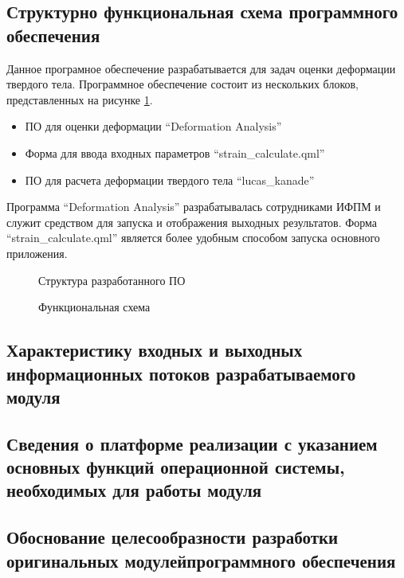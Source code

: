 \subsection{Структурно функциональная схема программного обеспечения}%

Данное програмное обеспечение разрабатывается для задач оценки деформации твердого тела. Программное обеспечение состоит из нескольких блоков, представленных на рисунке \ref{pic:shema_PO}.

\begin{itemize}
\item ПО для оценки деформации ``Deformation Analysis''
\item Форма для ввода входных параметров ``strain\_calculate.qml''
\item ПО для расчета деформации твердого тела ``lucas\_kanade''
\end{itemize}

Программа ``Deformation Analysis'' разрабатывалась сотрудниками ИФПМ и служит средством для запуска и отображения выходных результатов. Форма ``strain\_calculate.qml'' является более удобным способом запуска основного приложения. 

\begin{figure}[ht]
\caption{Структура разработанного ПО}
\label{pic:shema_PO}
\end{figure}

\begin{figure}[ht]
\caption{Функциональная схема}
\label{pic:idef0}
\end{figure}

\subsection{Характеристику входных и выходных информационных потоков разрабатываемого модуля}

\subsection{Сведения о платформе реализации с указанием основных функций операционной системы, необходимых для работы модуля}
\subsection{Обоснование целесообразности разработки оригинальных модулейпрограммного обеспечения}
